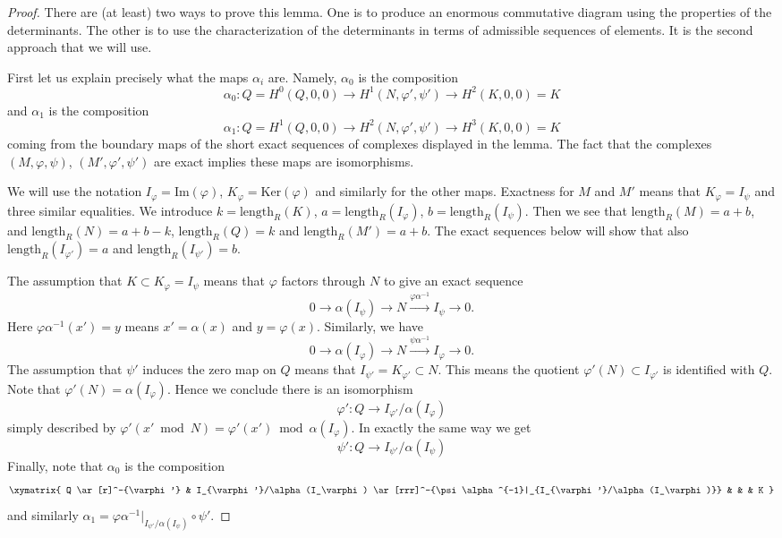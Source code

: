 \begin{proof}
There are (at least) two ways to prove this lemma. One is to produce an
enormous commutative diagram using the properties of the determinants.
The other is to use the characterization of the determinants in terms
of admissible sequences of elements. It is the second approach that we
will use.

\medskip\noindent
First let us explain precisely what the maps $\alpha_i$ are.
Namely, $\alpha_0$ is the composition
$$
\alpha_0 : Q = H^0(Q, 0, 0) \to H^1(N, \varphi', \psi') \to H^2(K, 0, 0) = K
$$
and $\alpha_1$ is the composition
$$
\alpha_1 : Q = H^1(Q, 0, 0) \to H^2(N, \varphi', \psi') \to H^3(K, 0, 0) = K
$$
coming from the boundary maps of the short exact sequences of complexes
displayed in the lemma. The fact that the
complexes $(M, \varphi, \psi)$, $(M', \varphi', \psi')$ are exact
implies these maps are isomorphisms.

\medskip\noindent
We will use the notation $I_\varphi = \text{Im}(\varphi)$,
$K_\varphi = \text{Ker}(\varphi)$ and similarly for the other maps.
Exactness for $M$ and $M'$
means that $K_\varphi = I_\psi$ and three similar equalities.
We introduce $k = \text{length}_R(K)$, $a = \text{length}_R(I_\varphi)$,
$b = \text{length}_R(I_\psi)$. Then we see that $\text{length}_R(M) = a + b$,
and $\text{length}_R(N) = a + b - k$, $\text{length}_R(Q) = k$
and $\text{length}_R(M') = a + b$. The exact sequences below will show
that also $\text{length}_R(I_{\varphi'}) = a$ and
$\text{length}_R(I_{\psi'}) = b$.

\medskip\noindent
The assumption that $K \subset K_\varphi = I_\psi$ means that
$\varphi$ factors through $N$ to give an exact sequence
$$
0 \to \alpha(I_\psi) \to N \xrightarrow{\varphi\alpha^{-1}} I_\psi \to 0.
$$
Here $\varphi\alpha^{-1}(x') = y$ means $x' = \alpha(x)$ and $y = \varphi(x)$.
Similarly, we have
$$
0 \to \alpha(I_\varphi) \to N \xrightarrow{\psi\alpha^{-1}} I_\varphi \to 0.
$$
The assumption that $\psi'$ induces the zero map on
$Q$ means that $I_{\psi'} = K_{\varphi'} \subset N$.
This means the quotient $\varphi'(N) \subset I_{\varphi'}$
is identified with $Q$. Note that $\varphi'(N) = \alpha(I_\varphi)$.
Hence we conclude there is an isomorphism
$$
\varphi' : Q \to I_{\varphi'}/\alpha(I_\varphi)
$$
simply described by
$\varphi'(x' \bmod N) = \varphi'(x') \bmod \alpha(I_\varphi)$.
In exactly the same way we get
$$
\psi' : Q \to I_{\psi'}/\alpha(I_\psi)
$$
Finally, note that $\alpha_0$ is the composition
$$
\xymatrix{
Q \ar[r]^-{\varphi'} &
I_{\varphi'}/\alpha(I_\varphi)
\ar[rrr]^-{\psi\alpha^{-1}|_{I_{\varphi'}/\alpha(I_\varphi)}} & & &
K
}
$$
and similarly
$\alpha_1 = \varphi\alpha^{-1}|_{I_{\psi'}/\alpha(I_\psi)} \circ \psi'$.


\end{proof}
